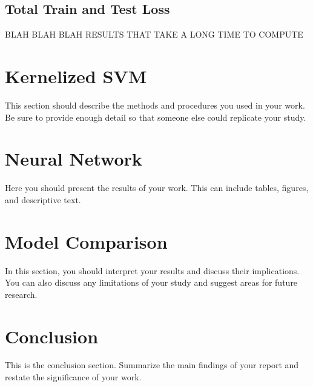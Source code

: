 \documentclass[12pt]{article}
\begin{document}
\subsection{Total Train and Test Loss}

BLAH BLAH BLAH RESULTS THAT TAKE A LONG TIME TO COMPUTE




\section{Kernelized SVM}
This section should describe the methods and procedures you used in your work. Be sure to provide enough detail so that someone else could replicate your study.

\section{Neural Network}
Here you should present the results of your work. This can include tables, figures, and descriptive text.

\section{Model Comparison}
In this section, you should interpret your results and discuss their implications. You can also discuss any limitations of your study and suggest areas for future research.

\section{Conclusion}
This is the conclusion section. Summarize the main findings of your report and restate the significance of your work.
\end{document}
